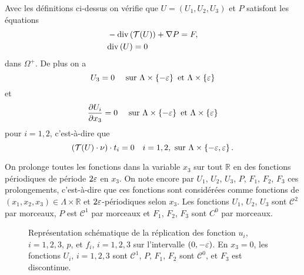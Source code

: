 Avec les définitions ci-dessus on vérifie que $U = (U_1, U_2, U_3)$ et
$P$ satisfont les équations
\begin{align}
  &-\mathrm{div}\left( \mathcal T(U) \right) + \nabla P = F,\label{eq:stokes-periodic-1}\\
  &\mathrm{div}\left( U \right) = 0\label{eq:stokes-periodic-2}
\end{align}
dans $\Omega^+$. De plus on a
\begin{equation}
U_3 = 0 \quad\text{ sur } \Lambda\times \left\{ -\varepsilon \right\} \text{ et } \Lambda\times \left\{ \varepsilon \right\}
\end{equation}
et
\begin{equation}
  \frac{\partial U_i}{\partial x_3} = 0\quad \text{ sur } \Lambda\times
  \left\{ -\varepsilon \right\} \text{ et } \Lambda\times \left\{ \varepsilon \right\}
\end{equation}
pour $i = 1,2$, c'est-à-dire que
\begin{equation}
\left( \mathcal T(U)\cdot \nu \right)\cdot t_i = 0\quad i = 1,2, \text{ sur } \Lambda\times
\left\{ -\varepsilon, \varepsilon \right\}.
\end{equation}

On prolonge toutes les fonctions dans la variable $x_3$ sur tout
$\mathbb R$ en des fonctions périodiques de période $2\varepsilon$ en
$x_3$. On note encore par $U_1$, $U_2$, $U_3$, $P$, $F_1$, $F_2$,
$F_3$ ces prolongements, c'est-à-dire que ces fonctions sont
considérées comme fonctions de $(x_1, x_2, x_3)\in \Lambda\times
\mathbb R$ et $2\varepsilon$-périodiques selon $x_3$. Les fonctions
$U_1$, $U_2$, $U_3$ sont $\mathcal C^2$ par morceaux, $P$ est
$\mathcal C^1$ par morceaux et $F_1$, $F_2$, $F_3$ sont $C^0$ par
morceaux.

\begin{figure}[h!]
  \begin{center}
    
    \caption{Représentation schématique de la réplication des fonction
    $u_i$, $i = 1,2,3$, $p$, et $f_i$, $i = 1,2,3$ sur l'intervalle
      $(0, -\varepsilon)$. En $x_3 = 0$, les fonctions $U_i$,
      $i=1,2,3$ sont $\mathcal C^1$, $P$, $F_1$, $F_2$ sont $\mathcal
      C^0$, et $F_3$ est discontinue.}
    \label{fig:solution-periodique}
  \end{center}
\end{figure}

